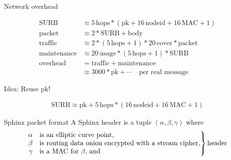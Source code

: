 \documentclass[fleqn,xcolor={usenames,dvipsnames},notes,aspectratio=169]{beamer} %
\begin{document}
\begin{frame}{Network overhead}

\begin{align*}
\mathrm{SURB} &\approx 5\,\mathrm{hops} * (\mathrm{pk} + 16\,\mathrm{nodeid} + 16\,\mathrm{MAC} + 1) \\
\mathrm{packet} &\approx 2 * \mathrm{SURB} + \mathrm{body} \\
\mathrm{traffic} &\approx 2 * (5\,\mathrm{hops} + 1) * 20\,\mathrm{cover} * \mathrm{packet} \\
\mathrm{maintenance} &\approx 20\,\mathrm{usage} * (5\,\mathrm{hops} + 1) *  \mathrm{SURB} \\
\mathrm{overhead} &= \mathrm{traffic} + \mathrm{maintenance} \\
 &\approx 3000 * \mathrm{pk} + \cdots \quad\textrm{per real message}
\end{align*}

\bigskip\pause

Idea:  Reuse $\mathrm{pk}$!

\begin{align*}
\mathrm{SURB} \approx \mathrm{pk} + 5\,\mathrm{hops} * (16\, \mathrm{nodeid} + 16\,\mathrm{MAC} + 1) 
\end{align*}

\end{frame}


\begin{frame}{Sphinx packet format}
A Sphinx header is a tuple $(\alpha,\beta,\gamma)$ where \\

 \vspace*{-18pt} \[
\left. \begin{array}{@{}rl@{}}
  \alpha & \text{is an elliptic curve point,}\\
  \beta & \text{is routing data onion encrypted with a stream cipher,}\\
  \gamma & \text{is a MAC for $\beta$, and} \\
\end{array} \right\} \text{header}
\]  %

\def\svgwidth{\columnwidth}


\end{frame}
\end{document}
